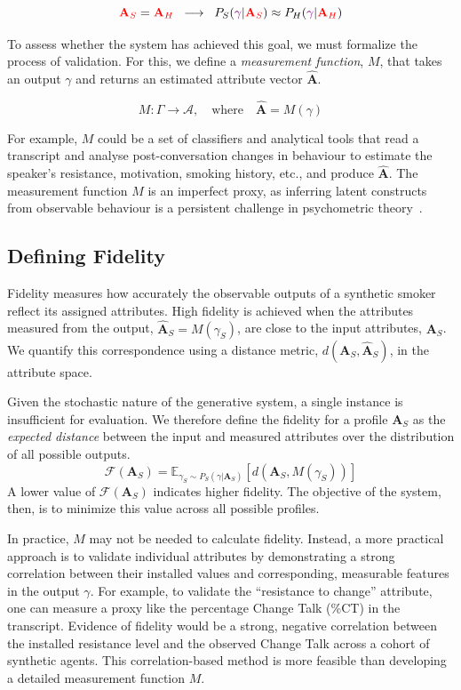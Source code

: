 \[ \textcolor{red}{\textbf{A}_S} = \textcolor{red}{\textbf{A}_H} \; \; \longrightarrow \;  \; P_S(\textcolor{violet}{\gamma} | \textcolor{red}{\textbf{A}_S}) \approx P_H(\textcolor{violet}{\gamma} | \textcolor{red}{\textbf{A}_H}) \]



To assess whether the system has achieved this goal, we must formalize the process of validation. For this, we define a \emph{measurement function}, $M$, that takes an output $\gamma$ and returns an estimated attribute vector $\hat{\textbf{A}}$.

\[M: \Gamma \rightarrow \mathcal{A}, \quad \text{where} \quad \hat{\textbf{A}} = M(\gamma)\]

For example, $M$ could be a set of classifiers and analytical tools that read a transcript and analyse post-conversation changes in behaviour to estimate the speaker's resistance, motivation, smoking history, etc., and produce $\hat{\textbf{A}}$. The measurement function $M$ is an imperfect proxy, as inferring latent constructs from observable behaviour is a persistent challenge in psychometric theory~\cite{loevinger1957objective, borsboom2004concept}.

\subsection{Defining Fidelity}
Fidelity measures how accurately the observable outputs of a synthetic smoker reflect its assigned attributes. High fidelity is achieved when the attributes measured from the output, $\hat{\textbf{A}}_S = M(\gamma_S)$, are close to the input attributes, $\textbf{A}_S$. We quantify this correspondence using a distance metric, $d(\textbf{A}_S, \hat{\textbf{A}}_S)$, in the attribute space.

Given the stochastic nature of the generative system, a single instance is insufficient for evaluation. We therefore define the fidelity for a profile $\textbf{A}_S$ as the \emph{expected distance} between the input and measured attributes over the distribution of all possible outputs.
\[\mathcal{F}(\textbf{A}_S) = \mathbb{E}_{\gamma_S \sim P_S(\gamma | \textbf{A}_S)}[d(\textbf{A}_S, M(\gamma_S))]\]
A lower value of $\mathcal{F}(\textbf{A}_S)$ indicates higher fidelity. The objective of the system, then, is to minimize this value across all possible profiles.

In practice, $M$ may not be needed to calculate fidelity. Instead, a more practical approach is to validate individual attributes by demonstrating a strong correlation between their installed values and corresponding, measurable features in the output $\gamma$. For example, to validate the ``resistance to change'' attribute, one can measure a proxy like the percentage Change Talk (\%CT) in the transcript. Evidence of fidelity would be a strong, negative correlation between the installed resistance level and the observed Change Talk across a cohort of synthetic agents. This correlation-based method is more feasible than developing a detailed measurement function $M$.


